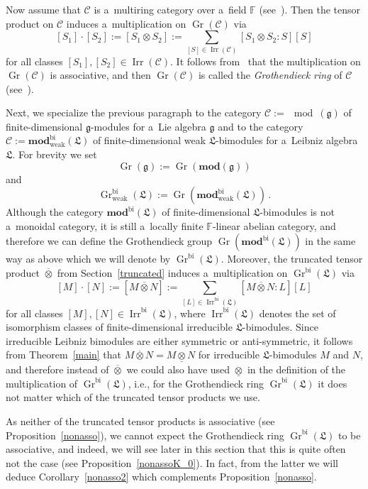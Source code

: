 \documentclass{jonasart}
\DeclareMathOperator{\bi}{bi}
\DeclareMathOperator{\irr}{Irr}
\DeclareMathOperator{\K}{Gr}
\DeclareMathOperator{\weak}{weak}
\newcommand{\ccal}{\mathcal{C}}
\newcommand{\fbb}{\mathbb{F}}
\newcommand{\fdmod}{\mathbf{mod}}
\newcommand{\gf}{\mathfrak{g}}
\newcommand{\lf}{\mathfrak{L}}
\newcommand{\ovo}{\overline{\otimes}}
\newcommand{\und}{\underline{\otimes}}
\begin{document}
	Now assume that $\ccal$ is a~multiring category over a~field $\fbb$
	(see~\cite[Definition~4.2.3]{EGNO}). Then the tensor product on $\ccal$
	induces a~multiplication on $\K(\ccal)$ via
	\[
		[S_1 ]
		\cdot[S_2 ]:=[S_1\otimes S_2 ]:=\sum_{[S]\in\irr(\ccal)}[S_1
		\otimes S_2:S][S]
	\]
	for all classes $[S_1 ],[S_2 ]\in\irr(\ccal)$. It follows from~\cite[Lemma
	4.5.1]{EGNO} that the multiplication on $\K(\ccal)$ is associative, and then $\K(\ccal)$ is called the \emph{Grothendieck ring\/} of $\ccal$
	(see~\cite[Definition~4.5.2]{EGNO}).

	Next, we specialize the previous paragraph to the category $\ccal:=
	\mod(\gf)$ of finite-dimensional $\gf$-modules for a~Lie algebra
	$\gf$ and to the category $\ccal:=\fdmod_{\weak}^{\bi}(\lf)$ of finite-dimensional weak $\lf$-bimodules for a~Leibniz algebra
	$\lf$. For brevity we set
	\[
		\K(\gf):=\K(\fdmod(\gf))
	\]
	and
	\[
		\K_{\weak}^{\bi}(\lf):=\K(\fdmod_{\weak}^{\bi}(\lf))\,.
	\]
	Although the category $\fdmod^{\bi}(\lf)$ of finite-dimensional $\lf$-bimodules is not a~monoidal category, it is still a~locally finite $\fbb$-linear abelian category, and therefore we can define the Grothendieck group $\K(\fdmod^{\bi}(\lf))$ in the same way as above which we will denote by $\K^{\bi}(\lf)$. Moreover, the truncated tensor product $\ovo$ from Section~\ref{truncated} induces a~multiplication on $\K^{\bi}(\lf)$ via
	\[
		[M]
		\cdot[N]:=[M\ovo N]:=\sum_{[L]\in\irr^{\bi}(\lf)}
		[M\ovo N:L][L]
	\]
	for all classes $[M],[N]\in\irr^{\bi}(\lf)$, where $\irr^{\bi}(\lf)$
	denotes the set of isomorphism classes of finite-dimensional irreducible $\lf$-bimodules. Since irreducible Leibniz bimodules are either symmetric or anti-symmetric, it follows from
	Theorem~\ref{main} that $M\ovo N=M\und N$ for irreducible
	$\lf$-bimodules $M$ and $N$, and therefore instead of $\ovo$
	we could also have used $\und$ in the definition of the multiplication of $\K^{\bi}(\lf)$, i.e., for the Grothendieck ring $\K^{\bi}(\lf)$
	it does not matter which of the truncated tensor products we use.

	As neither of the truncated tensor products is associative
	(see Proposition~\ref{nonasso}), we cannot expect the
	Grothendieck ring $\K^{\bi}(\lf)$ to be associative, and indeed, we will see later in this section that this is quite often not the case (see Proposition~\ref{nonassoK_0}). In fact, from the latter we will deduce Corollary~\ref{nonasso2}
	which complements Proposition~\ref{nonasso}.
\end{document}
